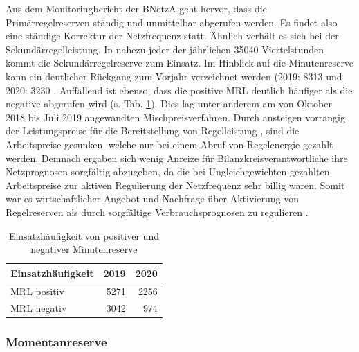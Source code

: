 			Aus dem Mo­ni­to­ring­be­rich­t der BNetzA geht hervor, dass die Primärregelreserven ständig und unmittelbar abgerufen werden. 
			Es findet also eine ständige Korrektur der Netzfrequenz statt.
			Ähnlich verhält es sich bei der Sekundärregelleistung. 
			In nahezu jeder der jährlichen \num{35040} Viertelstunden kommt die Sekundärregelreserve zum Einsatz.
			Im Hinblick auf die Minutenreserve kann ein deutlicher Rückgang zum Vorjahr verzeichnet werden (2019: 8313 und 2020: 3230 \cite{Monitoringbericht_BNetzA}.
			Auffallend ist ebenso, dass die positive MRL deutlich häufiger als die negative abgerufen wird (s. Tab. \ref{Tab. Abrufen von Minutenreserve}).
			Dies lag unter anderem am von Oktober 2018 bis Juli 2019 angewandten Mischpreisverfahren.
			Durch ansteigen vorrangig der Leistungspreise für die Bereitstellung von Regelleistung , sind die Arbeitspreise gesunken, welche nur bei einem Abruf von Regelenergie gezahlt werden.
			Demnach ergaben sich wenig Anreize für Bilanzkreisverantwortliche ihre Netzprognosen sorgfältig abzugeben, da die bei Ungleichgewichten gezahlten Arbeitspreise zur aktiven Regulierung der Netzfrequenz sehr billig waren.
			Somit war es wirtschaftlicher Angebot und Nachfrage über Aktivierung von Regelreserven als durch sorgfältige Verbrauchsprognosen zu regulieren \cite{Monitoringbericht_BNetzA}.
						
			\begin{table}[H]
				\centering
				\caption{Einsatzhäufigkeit von positiver und negativer Minutenreserve \cite{Monitoringbericht_BNetzA}}
				\label{Tab. Abrufen von Minutenreserve}
				\begin{tabular}{lrr}
					\hline
					Einsatzhäufigkeit & 2019 & 2020 \\ \hline
					MRL positiv & 5271 & 2256 \\
					MRL negativ & 3042 & 974 \\ \hline
				\end{tabular}
			\end{table}
			
								
		\subsubsection{Momentanreserve}
		

